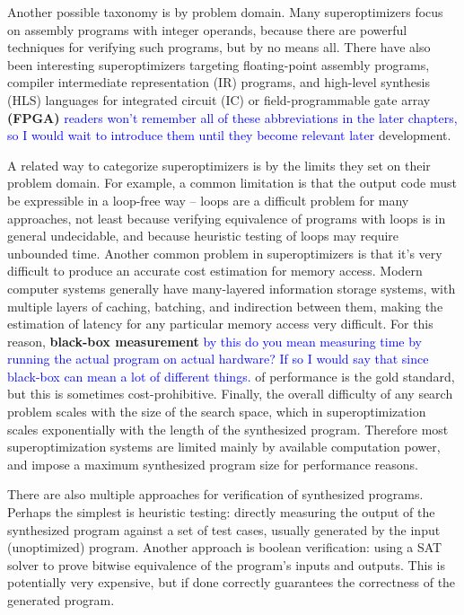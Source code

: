 \documentclass[12pt,twoside]{reedthesis}
\newcommand{\comment}[2]{\textbf{#1} \textcolor{blue}{#2}}
\begin{document}
    Another possible taxonomy is by problem domain.
    Many superoptimizers focus on assembly programs with integer operands, because there are powerful techniques for verifying such programs, but by no means all.
    There have also been interesting superoptimizers targeting 
        floating-point assembly programs, 
        compiler intermediate representation (IR) programs, 
        and high-level synthesis (HLS) languages for integrated circuit (IC) or field-programmable gate array \comment{(FPGA)}{readers won't remember all of these abbreviations in the later chapters, so I would wait to introduce them until they become relevant later} development.
    
    A related way to categorize superoptimizers is by the limits they set on their problem domain.
    For example, a common limitation is that the output code must be expressible in a loop-free way
        -- loops are a difficult problem for many approaches,
            not least because verifying equivalence of programs with loops is in general undecidable,
            and because heuristic testing of loops may require unbounded time.
    Another common problem in superoptimizers is that it's very difficult to produce an accurate cost estimation for memory access.
        Modern computer systems generally have many-layered information storage systems, with multiple layers of caching, batching, and indirection between them, making the estimation of latency for any particular memory access very difficult.
        For this reason, \comment{black-box measurement}{by this do you mean measuring time by running the actual program on actual hardware? If so I would say that since black-box can mean a lot of different things.} of performance is the gold standard, but this is sometimes cost-prohibitive.
    Finally, the overall difficulty of any search problem scales with the size of the search space, which in superoptimization scales exponentially with the length of the synthesized program.
        Therefore most superoptimization systems are limited mainly by available computation power, and impose a maximum synthesized program size for performance reasons.
    
    
    There are also multiple approaches for verification of synthesized programs.
    Perhaps the simplest is heuristic testing: 
        directly measuring the output of the synthesized program against a set of test cases, usually generated by the input (unoptimized) program.
    Another approach is boolean verification: using a SAT solver to prove bitwise equivalence of the program's inputs and outputs.
    This is potentially very expensive, but if done correctly guarantees the correctness of the generated program. 
    
\end{document}
